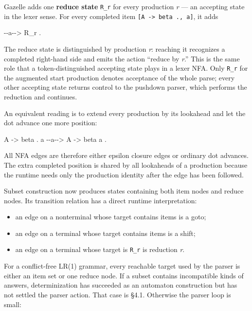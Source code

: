 \documentclass[
  10pt,
]{article}
\newenvironment{Shaded}{}{}
\newcommand{\NormalTok}[1]{#1}
\providecommand{\tightlist}{%
  \setlength{\itemsep}{0pt}\setlength{\parskip}{0pt}}
\begin{document}
Gazelle adds one \textbf{reduce state} \texttt{R\_r} for every
production \emph{r} --- an accepting state in the lexer sense. For every
completed item \texttt{{[}A\ -\textgreater{}\ beta\ .,\ a{]}}, it adds

\begin{Shaded}
\begin{Highlighting}[]
\NormalTok{[A {-}\textgreater{} beta ., a] {-}{-}a{-}{-}\textgreater{} R\_r .}
\end{Highlighting}
\end{Shaded}

The reduce state is distinguished by production \emph{r}: reaching it
recognizes a completed right-hand side and emits the action ``reduce by
\emph{r}.'' This is the same role that a token-distinguished accepting
state plays in a lexer NFA. Only \texttt{R\_r} for the augmented start
production denotes acceptance of the whole parse; every other accepting
state returns control to the pushdown parser, which performs the
reduction and continues.

An equivalent reading is to extend every production by its lookahead and
let the dot advance one more position:

\begin{Shaded}
\begin{Highlighting}[]
\NormalTok{A {-}\textgreater{} beta . a  {-}{-}a{-}{-}\textgreater{}  A {-}\textgreater{} beta a .}
\end{Highlighting}
\end{Shaded}

All NFA edges are therefore either epsilon closure edges or ordinary dot
advances. The extra completed position is shared by all lookaheads of a
production because the runtime needs only the production identity after
the edge has been followed.

Subset construction now produces states containing both item nodes and
reduce nodes. Its transition relation has a direct runtime
interpretation:

\begin{itemize}
\tightlist
\item
  an edge on a nonterminal whose target contains items is a goto;
\item
  an edge on a terminal whose target contains items is a shift;
\item
  an edge on a terminal whose target is \texttt{R\_r} is reduction
  \emph{r}.
\end{itemize}

For a conflict-free LR(1) grammar, every reachable target used by the
parser is either an item set or one reduce node. If a subset contains
incompatible kinds of answers, determinization has succeeded as an
automaton construction but has not settled the parser action. That case
is §4.1. Otherwise the parser loop is small:
\end{document}
